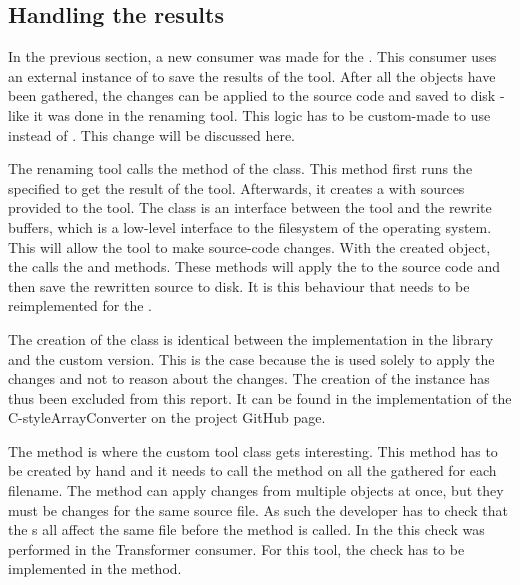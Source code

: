 \subsection{Handling the results}

In the previous section, a new consumer was made for the . This consumer uses an external instance of  to save the results of the tool. After all the  objects have been gathered, the changes can be applied to the source code and saved to disk - like it was done in the renaming tool. This logic has to be custom-made to use  instead of . This change will be discussed here.

The renaming tool calls the  method of the  class. This method first runs the specified  to get the result of the tool. Afterwards, it creates a  with sources provided to the tool. The  class is an interface between the tool and the rewrite buffers, which is a low-level interface to the filesystem of the operating system.
This  will allow the tool to make source-code changes. With the created  object, the  calls the  and  methods. These methods will apply the  to the source code and then save the rewritten source to disk. It is this behaviour that needs to be reimplemented for the .

The creation of the  class is identical between the implementation in the library and the custom version. This is the case because the  is used solely to apply the changes and not to reason about the changes. The creation of the  instance has thus been excluded from this report. It can be found in the implementation of the C-styleArrayConverter on the project GitHub page. 

The  method is where the custom tool class gets interesting. This method has to be created by hand and it needs to call the  method on all the gathered  for each filename. The  method can apply changes from multiple  objects at once, but they must be changes for the same source file.
As such the developer has to check that the s all affect the same file before the  method is called. 
In the  this check was performed in the Transformer consumer. 
For this tool, the check has to be implemented in the  method.

